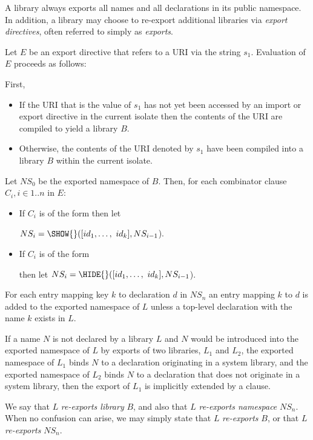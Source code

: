 \documentclass{article}
\begin{document}
\LMHash{}
A library always exports all names and all declarations in its public namespace.
In addition, a library may choose to re-export additional libraries via {\em export directives}, often referred to simply as {\em exports}.

\LMHash{}
Let $E$ be an export directive that refers to a URI via the string $s_1$.
Evaluation of $E$ proceeds as follows:

\LMHash{}
First,

\begin{itemize}
\item
If the URI that is the value of $s_1$ has not yet been accessed by an import or export directive in the current isolate then the contents of the URI are compiled to yield a library $B$.
\item Otherwise, the contents of the URI denoted by $s_1$ have been compiled into a library $B$ within the current isolate.
\end{itemize}

\LMHash{}
Let $NS_0$ be the exported namespace of $B$.
Then, for each combinator clause $C_i, i \in 1 .. n$ in $E$:
\begin{itemize}
\item If $C_i$ is of the form  then let

$NS_i = \SHOW{}([id_1, \ldots,\ id_k], NS_{i-1}$).
\item If $C_i$ is of the form 

then let $NS_i = \HIDE{}([id_1, \ldots,\ id_k], NS_{i-1}$).
\end{itemize}

\LMHash{}
For each
entry mapping key $k$ to declaration $d$ in $NS_n$ an entry mapping $k$ to $d$ is added to the exported namespace of $L$ unless a top-level declaration with the name $k$ exists in $L$.

\LMHash{}
If a name $N$ is not declared by a library $L$
and $N$ would be introduced into the exported namespace of $L$
by exports of two libraries, $L_1$ and $L_2$,
the exported namespace of $L_1$ binds $N$ to a declaration originating in a system library,
and the exported namespace of $L_2$ binds $N$ to a declaration
that does not originate in a system library,
then the export of $L_1$ is implicitly extended by a  clause.


\LMHash{}
We say that $L$ {\em re-exports library } $B$, and also that $L$ {\em re-exports namespace } $NS_n$.
When no confusion can arise, we may simply state that $L$ {\em re-exports }$B$, or that $L$ {\em re-exports }$NS_n$.
\end{document}
